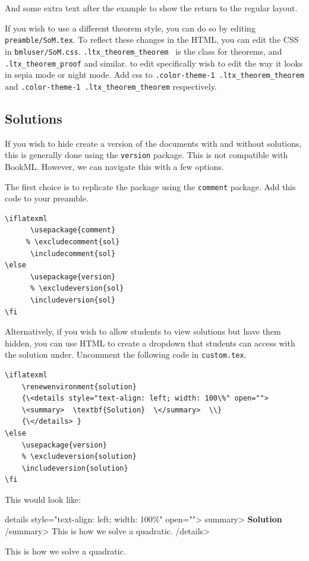 And some extra text after the example to show the return to the regular layout.

If you wish to use a different theorem style, you can do so by editing \verb|preamble/SoM.tex|. To reflect these changes in the HTML, you can edit the CSS in \verb|bmluser/SoM.css|. \verb|.ltx_theorem_theorem | is the class for theorems, and \verb|.ltx_theorem_proof| and similar. to edit specifically wish to edit the way it looks in sepia mode or night mode. Add css to \verb|.color-theme-1 .ltx_theorem_theorem| and \verb|.color-theme-1 .ltx_theorem_theorem| respectively.

\subsection{Solutions}

If you wish to hide create a version of the documents with and without solutions, this is generally done using the \verb|version| package. This is not compatible with BookML. However, we can navigate this with a few options. 

The first choice is to replicate the package using the \verb|comment| package. Add this code to your preamble. 

\begin{lstlisting}
\iflatexml 
      \usepackage{comment} 
     % \excludecomment{sol} 
      \includecomment{sol} 
\else 
      \usepackage{version} 
      % \excludeversion{sol} 
      \includeversion{sol} 
\fi 
\end{lstlisting}

Alternatively, if you wish to allow students to view solutions but have them hidden, you can use HTML to create a dropdown that students can access with the solution under. Uncomment the following code in \verb|custom.tex|.

\begin{lstlisting}
\iflatexml  
    \renewenvironment{solution} 
    {\<details style="text-align: left; width: 100\%" open="">  
    \<summary>  \textbf{Solution}  \</summary>  \\} 
    {\</details> } 
\else 
    \usepackage{version}  
    % \excludeversion{solution}  
    \includeversion{solution}  
\fi 
\end{lstlisting}

This would look like:

\iflatexml  
\<details style="text-align: left; width: 100\%" open="">  \<summary>  \textbf{Solution}  \</summary>  This is how we solve a quadratic.  
    \</details> 
\else 
    \begin{solution}
        This is how we solve a quadratic. 
    \end{solution} 
\fi 




